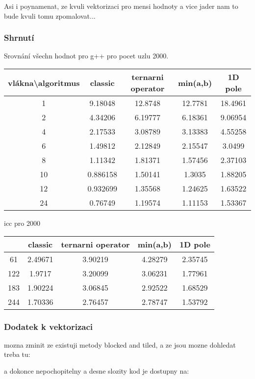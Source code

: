 \documentclass[a4paper,11pt]{article}
\begin{document}
Asi i poynamenat, ze kvuli vektorizaci pro mensi hodnoty a vice jader nam to bude kvuli tomu zpomalovat...


\subsubsection{Shrnutí}
Srovnání všechn hodnot pro g++ pro pocet uzlu 2000.

\begin{tabular}{|c|c|c|c|c|}
	\hline vlákna\textbackslash algoritmus & classic & ternarni operator & min(a,b) & 1D pole \\ 
	\hline 1 & 9.18048 & 12.8748 & 12.7781 & 18.4961 \\ 
	\hline 2 & 4.34206 & 6.19777 & 6.18361 & 9.06954 \\ 
	\hline 4 & 2.17533 & 3.08789 & 3.13383 & 4.55258 \\ 
	\hline 6 & 1.49812 & 2.12849 & 2.15547 & 3.0499 \\ 
	\hline 8 & 1.11342 & 1.81371 & 1.57456 & 2.37103 \\ 
	\hline 10 & 0.886158 & 1.50141 & 1.3035 & 1.88205 \\ 
	\hline 12 & 0.932699 & 1.35568 & 1.24625 & 1.63522 \\ 
	\hline 24 & 0.76749 & 1.19574 & 1.11153 & 1.53367 \\ 
	\hline 
\end{tabular} 

icc pro 2000
\begin{tabular}{|c|c|c|c|c|}
	\hline  & classic & ternarni operator & min(a,b) & 1D pole \\ 
	\hline 61 & 2.49671 & 3.90219 & 4.28279 & 2.35745 \\ 
	\hline 122 & 1.9717 & 3.20099 & 3.06231 & 1.77961 \\ 
	\hline 183 & 1.90224 & 3.06845 & 2.92522 & 1.68529 \\ 
	\hline 244 & 1.70336 & 2.76457 & 2.78747 & 1.53792 \\ 
	\hline 
\end{tabular} 

\subsubsection{Dodatek k vektorizaci}
mozna zminit ze existuji metody blocked and tiled, a ze jsou mozne dohledat treba tu:

a dokonce nepochopitelny a desne slozity kod je dostupny na: 
\end{document}
